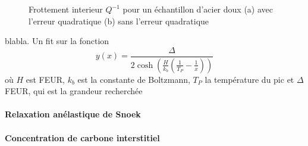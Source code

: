 \begin{figure}[h]
    \centering
    \begin{subfigure}{0.48\linewidth}
        \centering
        \caption{}
        \label{fig:acier_doux_temp_unadjusted}
    \end{subfigure}
    \begin{subfigure}{0.48\linewidth}
        \centering
        \caption{}
        \label{fig:acier_doux_temp_adjusted}
    \end{subfigure}
    \caption{Frottement interieur \(Q^{-1}\) pour un échantillon d'acier doux (a) avec l'erreur quadratique (b) sans l'erreur quadratique}
\end{figure}


blabla. Un fit sur la fonction
\begin{equation}
    y(x) = \frac{\Delta}{2 \cosh \left(\frac{H}{k_b}\left(\frac{1}{T_P} - \frac{1}{x}\right)\right)}
    \label{eq:fit_q1}
\end{equation}
où \(H\) est FEUR, \(k_b\) est la constante de Boltzmann, \(T_P\) la température du pic et \(\Delta\) FEUR, qui est la grandeur recherchée

\paragraph{Relaxation anélastique de Snoek}

\paragraph{Concentration de carbone interstitiel}
